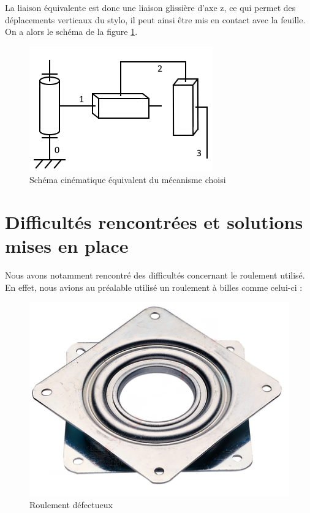 \documentclass[12pt,a4paper]{report}
\begin{document}
La liaison équivalente est donc une liaison glissière d'axe z, ce qui permet des déplacements verticaux du stylo, il peut ainsi être mis en contact avec la feuille.
On a alors le schéma de la figure \ref{Schema_cine_simp}.

\begin{figure}[!h]
 \center
 \includegraphics[scale=1.1]{../pictures/schema_cinematique_simplifie.png}
 \caption{Schéma cinématique équivalent du mécanisme choisi}
 \label{Schema_cine_simp}
\end{figure}

	\section{Difficultés rencontrées et solutions mises en place}
	Nous avons notamment rencontré des difficultés concernant le roulement utilisé. En effet, nous avions au préalable utilisé un roulement à billes comme celui-ci :
	
	\begin{figure}[!h]
 \center
 \includegraphics[scale=0.5]{../pictures/roulementmerdique}
 \caption{Roulement défectueux}
\end{figure}
\end{document}
